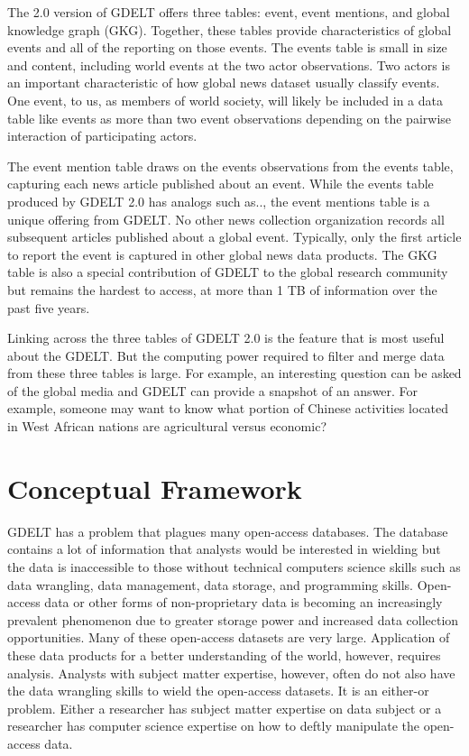 \documentclass[preprint,authoryear,12pt]{elsarticle/elsarticle}
\begin{document}
The 2.0 version of GDELT offers three tables: event, event mentions, and global knowledge graph (GKG). Together, these tables provide characteristics of global events and all of the reporting on those events. The events table is small in size and content, including world events at the two actor observations. Two actors is an important characteristic of how global news dataset usually classify events. One event, to us, as members of world society, will likely be included in a data table like events as more than two event observations depending on the pairwise interaction of participating actors. 

The event mention table draws on the events observations from the events table, capturing each news article published about an event. While the events table produced by GDELT 2.0 has analogs such as.., the event mentions table is a unique offering from GDELT. No other news collection organization records all subsequent articles published about a global event. Typically, only the first article to report the event is captured in other global news data products. The GKG table is also a special contribution of GDELT to the global research community but remains the hardest to access, at more than 1 TB of information over the past five years.

Linking across the three tables of GDELT 2.0 is the feature that is most useful about the GDELT. But the computing power required to filter and merge data from these three tables is large. For example, an interesting question can be asked of the global media and GDELT can provide a snapshot of an answer. For example, someone may want to know what portion of Chinese activities located in West African nations are agricultural versus economic? 

\section{Conceptual Framework}
\label{sec:concept}
GDELT has a problem that plagues many open-access databases. The database contains a lot of information that analysts would be interested in wielding but the data is inaccessible to those without technical computers science skills such as data wrangling, data management, data storage, and programming skills. Open-access data or other forms of non-proprietary data is becoming an increasingly prevalent phenomenon due to greater storage power and increased data collection opportunities. Many of these open-access datasets are very large. Application of these data products for a better understanding of the world, however, requires analysis. Analysts with subject matter expertise, however, often do not also have the data wrangling skills to wield the open-access datasets. It is an either-or problem. Either a researcher has subject matter expertise on data subject or a researcher has computer science expertise on how to deftly manipulate the open-access data.
\end{document}
